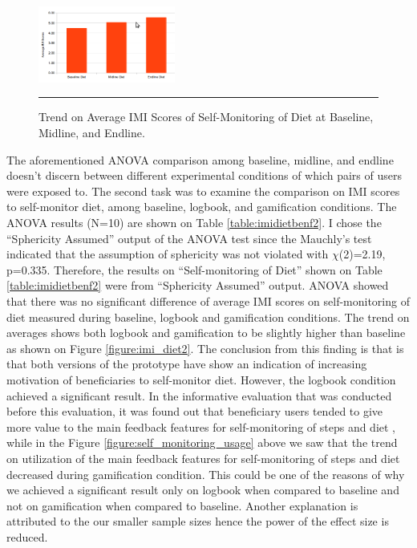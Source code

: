 \begin{figure}[htbp]
  \centering
    \includegraphics[width=0.4\textwidth]{Figures/imi_diet.png}
    \rule{35em}{0.5pt}
  \caption{Trend on Average IMI Scores of Self-Monitoring of Diet at Baseline, Midline, and Endline.}
  \label{figure:imi_diet}
\end{figure}\newline
The aforementioned ANOVA comparison among baseline, midline, and endline doesn't discern between different experimental conditions of which pairs of users were exposed to. The second task was to examine the comparison on IMI scores to self-monitor diet, among baseline, logbook, and gamification conditions. The ANOVA results (N=10) are shown on Table  \ref{table:imidietbenf2}. I chose the ``Sphericity Assumed'' output of the ANOVA test since the Mauchly’s test indicated that the assumption of sphericity was not violated with  $\chi{}$(2)=2.19, p=0.335. Therefore, the results on  ``Self-monitoring of Diet'' shown on Table \ref{table:imidietbenf2} were from ``Sphericity Assumed'' output. ANOVA showed that there was no significant difference of average IMI scores on self-monitoring of diet measured during baseline, logbook and gamification conditions. The trend on averages shows both logbook and gamification to be slightly higher than baseline as shown on Figure \ref{figure:imi_diet2}. The conclusion from this finding is that is that both versions of the prototype have show an indication of increasing motivation of beneficiaries to self-monitor diet. However, the logbook condition achieved a significant result. In the informative evaluation that was conducted before this evaluation, it was found out that beneficiary users tended to give more value to the main feedback features for self-monitoring of steps and diet \citep{katule2016leveraging}, while in the Figure \ref{figure:self_monitoring_usage} above we saw that the trend on utilization of the main feedback features for self-monitoring of steps and diet decreased during gamification condition. This could be one of the reasons of why we achieved a significant result only on logbook when compared to baseline and not on gamification when compared to baseline. Another explanation is attributed to the our smaller sample sizes hence the power of the effect size is reduced.\newline
